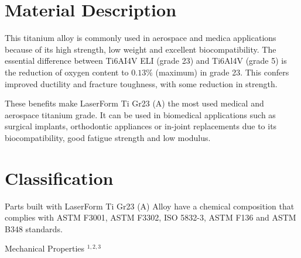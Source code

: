 \documentclass[10pt]{article}
\begin{document}
\section*{Material Description}
This titanium alloy is commonly used in aerospace and medica applications because of its high strength, low weight and excellent biocompatibility. The essential difference between Ti6AI4V ELI (grade 23) and Ti6Al4V (grade 5) is the reduction of oxygen content to $0.13 \%$ (maximum) in grade 23. This confers improved ductility and fracture toughness, with some reduction in strength.

These benefits make LaserForm Ti Gr23 (A) the most used medical and aerospace titanium grade. It can be used in biomedical applications such as surgical implants, orthodontic appliances or in-joint replacements due to its biocompatibility, good fatigue strength and low modulus.

\section*{Classification}
Parts built with LaserForm Ti Gr23 (A) Alloy have a chemical composition that complies with ASTM F3001, ASTM F3302, ISO 5832-3, ASTM F136 and ASTM B348 standards.

Mechanical Properties ${ }^{1,2,3}$
\end{document}
